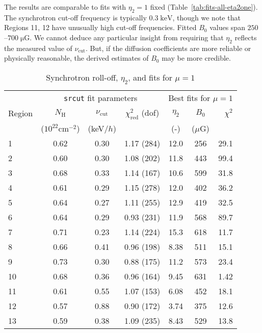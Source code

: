 \documentclass[manuscript]{aastex}  %
\newcommand*{\mt}{\mathrm}
\newcommand*{\unit}[1]{\;\mt{#1}}  %
\newcommand*{\muG}{\unit{\mu G}}
\begin{document}
The results are comparable to fits with $\eta_2 = 1$ fixed
(Table~\ref{tab:fits-all-eta2one}).  The synchrotron cut-off frequency is
typically $0.3 \unit{keV}$, though we note that Regions 11, 12 have unusually
high cut-off frequencies.  Fitted $B_0$ values span $250$--$700 \muG$.
We cannot deduce any particular insight from requiring that $\eta_2$ reflects
the measured value of $\nu_{\mt{cut}}$.  But, if the diffusion coefficients are
more reliable or physically reasonable, the derived estimates of $B_0$ may be
more credible.

\begin{table}
    \scriptsize
    \centering
    \caption{Synchrotron roll-off, $\eta_2$, and fits for $\mu = 1$
        \label{tab:fits-srcutlog}}
    \begin{tabular}{@{}l ccc ccr@{}}
    \toprule
    {} & \multicolumn{3}{c}{\texttt{srcut} fit parameters}
       & \multicolumn{3}{c}{Best fits for $\mu = 1$}\\
    \cmidrule(lr){2-4} \cmidrule(l){5-7}
    Region & $N_{\mt{H}}$ & $\nu_{\mt{cut}}$ & $\chi^2_{\mathrm{red}}$ (dof)
           & $\eta_2$ & $B_0$ & $\chi^2$ \\
    {} & ($10^{22} \mt{cm}^{-2}$) & (keV/$h$) & {}
       & (-) & ($\mu$G) & {} \\
    \midrule
     1 & 0.62 & 0.30 & 1.17 (284) & 12.0 & 256 & 29.1 \\
     2 & 0.60 & 0.30 & 1.08 (202) & 11.8 & 443 & 99.4 \\
     3 & 0.68 & 0.33 & 1.14 (167) & 10.6 & 599 & 31.8 \\
    \cmidrule{1-7}
     4 & 0.61 & 0.29 & 1.15 (278) & 12.0 & 402 & 36.2 \\
     5 & 0.64 & 0.27 & 1.11 (255) & 12.9 & 419 & 32.5 \\
     6 & 0.64 & 0.29 & 0.93 (231) & 11.9 & 568 & 89.7 \\
     7 & 0.71 & 0.23 & 1.14 (224) & 15.3 & 618 & 11.7 \\
     8 & 0.66 & 0.41 & 0.96 (198) & 8.38 & 511 & 15.1 \\
     9 & 0.73 & 0.30 & 0.88 (175) & 11.2 & 573 & 23.4 \\
    10 & 0.68 & 0.36 & 0.96 (164) & 9.45 & 631 & 1.42 \\
    \cmidrule{1-7}
    11 & 0.61 & 0.55 & 1.07 (153) & 6.08 & 452 & 18.1 \\
    12 & 0.57 & 0.88 & 0.90 (172) & 3.74 & 375 & 12.6 \\
    13 & 0.59 & 0.38 & 1.09 (235) & 8.43 & 529 & 13.8 \\

\end{tabular}
\end{table}
\end{document}
